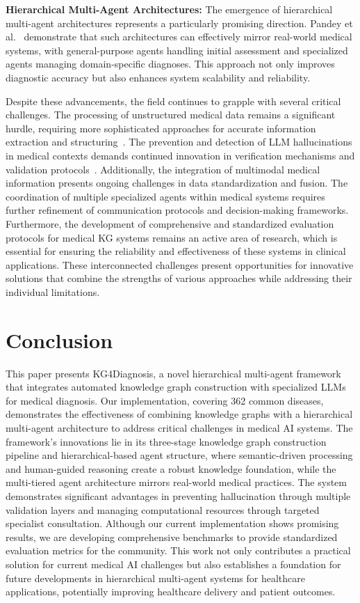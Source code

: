 \documentclass[letterpaper]{article} %
\begin{document}
\textbf{Hierarchical Multi-Agent Architectures:} 
The emergence of hierarchical multi-agent architectures represents a particularly promising direction. Pandey et al.~\cite{pandey-etal-2024-advancing} demonstrate that such architectures can effectively mirror real-world medical systems, with general-purpose agents handling initial assessment and specialized agents managing domain-specific diagnoses. This approach not only improves diagnostic accuracy but also enhances system scalability and reliability.

Despite these advancements, the field continues to grapple with several critical challenges. The processing of unstructured medical data remains a significant hurdle, requiring more sophisticated approaches for accurate information extraction and structuring~\cite{avula2022data}. The prevention and detection of LLM hallucinations in medical contexts demands continued innovation in verification mechanisms and validation protocols~\cite{huang2023survey}. Additionally, the integration of multimodal medical information presents ongoing challenges in data standardization and fusion. The coordination of multiple specialized agents within medical systems requires further refinement of communication protocols and decision-making frameworks. Furthermore, the development of comprehensive and standardized evaluation protocols for medical KG systems remains an active area of research, which is essential for ensuring the reliability and effectiveness of these systems in clinical applications. These interconnected challenges present opportunities for innovative solutions that combine the strengths of various approaches while addressing their individual limitations.
\section{Conclusion}
This paper presents KG4Diagnosis, a novel hierarchical multi-agent framework that integrates automated knowledge graph construction with specialized LLMs for medical diagnosis. Our implementation, covering 362 common diseases, demonstrates the effectiveness of combining knowledge graphs with a hierarchical multi-agent architecture to address critical challenges in medical AI systems. The framework's innovations lie in its three-stage knowledge graph construction pipeline and hierarchical-based agent structure, where semantic-driven processing and human-guided reasoning create a robust knowledge foundation, while the multi-tiered agent architecture mirrors real-world medical practices. The system demonstrates significant advantages in preventing hallucination through multiple validation layers and managing computational resources through targeted specialist consultation. Although our current implementation shows promising results, we are developing comprehensive benchmarks to provide standardized evaluation metrics for the community. This work not only contributes a practical solution for current medical AI challenges but also establishes a foundation for future developments in hierarchical multi-agent systems for healthcare applications, potentially improving healthcare delivery and patient outcomes.

\clearpage


\end{document}
